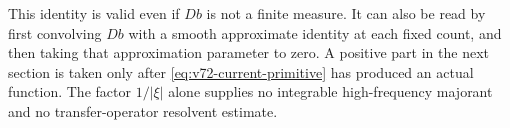 This identity is valid even if $Db$ is not a finite measure. It can
also be read by first convolving $Db$ with a smooth approximate
identity at each fixed count, and then taking that approximation
parameter to zero. A positive part in the next section is taken
only after \eqref{eq:v72-current-primitive} has produced an actual
function. The factor $1/|\xi|$ alone supplies no integrable
high-frequency majorant and no transfer-operator resolvent estimate.

